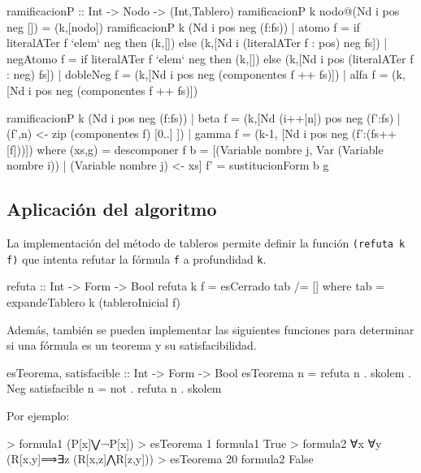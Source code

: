 \documentclass[aspectratio=169]{beamer}
\begin{document}
\begin{frame}[fragile]
\begin{code}
ramificacionP :: Int -> Nodo -> (Int,Tablero)
ramificacionP k nodo@(Nd i pos neg []) = (k,[nodo])
ramificacionP k (Nd i pos neg (f:fs))
  | atomo    f = 
      if literalATer f `elem` neg
      then (k,[])
      else (k,[Nd i (literalATer f : pos) neg fs])
  | negAtomo f = 
      if literalATer f `elem` neg
      then (k,[]) 
      else (k,[Nd i pos (literalATer f : neg) fs])
  | dobleNeg f = 
      (k,[Nd i pos neg (componentes f ++ fs)])
  | alfa     f = 
      (k,[Nd i pos neg (componentes f ++ fs)])
\end{code}  
\end{frame}

\begin{frame}[fragile]
  \begin{code}
ramificacionP k (Nd i pos neg (f:fs))
    | beta     f = 
        (k,[Nd (i++[n]) pos neg (f':fs)
           | (f',n) <- zip (componentes f) [0..] ])
    | gamma    f = (k-1, [Nd i pos neg (f':(fs++[f]))])
    where 
      (xs,g) = descomponer f
      b      =
          [(Variable nombre j, Var (Variable nombre i))
          | (Variable nombre j) <- xs]
      f'     = sustitucionForm b g
  \end{code}
\end{frame}

\subsection{Aplicación del algoritmo}

\begin{frame}[fragile]
  La implementación del método de tableros permite definir la función \texttt{(refuta k f)}
  que intenta refutar la fórmula \texttt{f} a profundidad \texttt{k}.
  \begin{code}
refuta :: Int -> Form -> Bool
refuta k f = esCerrado tab /= []
    where tab = expandeTablero k (tableroInicial f)  
  \end{code}
  Además, también se pueden implementar las siguientes funciones para determinar si una fórmula
  es un teorema y su satisfacibilidad. 
  \begin{code}
esTeorema, satisfacible :: Int -> Form -> Bool
esTeorema n = refuta n . skolem . Neg
satisfacible n = not . refuta n . skolem
\end{code}
\end{frame}

\begin{frame}[fragile]
  Por ejemplo:

\begin{code}  
> formula1
(P[x]⋁¬P[x])
> esTeorema 1 formula1
True
> formula2
∀x ∀y (R[x,y]⟹∃z (R[x,z]⋀R[z,y]))
> esTeorema 20 formula2
False
\end{code}  
\end{frame}
\end{document}
